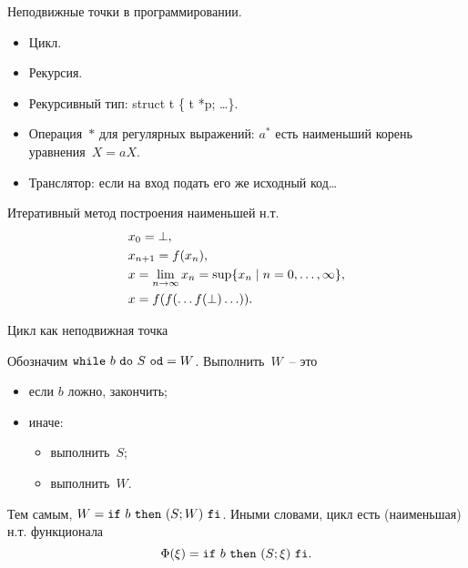 \documentclass[landscape]{slides}
\begin{document}
\begin{slide}
        Неподвижные точки в программировании.
        \begin{itemize}
                \item Цикл.
                \item Рекурсия.
                \item Рекурсивный тип: struct t \{ t *p; \ldots \}.
                \item Операция~$\ast$ для регулярных выражений: $a^\ast$ есть наименьший корень уравнения~$X = aX$.
                \item Транслятор: если на вход подать его же исходный код\ldots
        \end{itemize}

        Итеративный метод построения наименьшей н.т.
        \begin{eqnarray*}
                &x_0 = \bot,\\
                &x_{n+1} = f(x_n),\\
                &x = \lim_{n\to\infty} x_n = \mathrm{sup} \{ x_n \mid n=0,\ldots,\infty\},\\
                &x = f(f(\ldots f(\bot) \ldots)) .
        \end{eqnarray*}
\end{slide}

\begin{slide}
        Цикл как неподвижная точка

        Обозначим $\mathtt{while}\ {b}\ \mathtt{do}\ {S}\ \mathtt{od} = W$. Выполнить~$W$~-- это
        \begin{itemize}
                \item если $b$ ложно, закончить;
                \item иначе:
                        \begin{itemize}
                                \item выполнить~$S$;
                                \item выполнить~$W$.
                        \end{itemize}
        \end{itemize}

        Тем самым, $W = \mathtt{if}\ {b}\ \mathtt{then}\ {(S ; W)}\ \mathtt{fi}$. Иными словами, цикл есть (наименьшая) н.т. функционала
        \[
                \Phi(\xi) = \mathtt{if}\ {b}\ \mathtt{then}\ {(S ; \xi)}\ \mathtt{fi} .
        \]
\end{slide}
\end{document}
